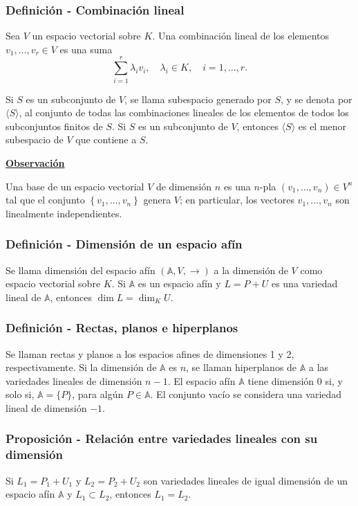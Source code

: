 \documentclass[12pt, a4paper, ones, notitlepage, openany,titlepage]{article}
\newcommand{\observacion}{\noindent\underline{\textbf{Observación}}}
\begin{document}
\subsubsection{Definición - Combinación lineal}
Sea $V$ un espacio vectorial sobre $K$. Una combinación lineal de los elementos $v_{1}, \ldots, v_{r} \in V$ es una suma
$$
\sum_{i=1}^{r} \lambda_{i} v_{i}, \quad \lambda_{i} \in K, \quad i=1, \ldots, r .
$$

Si $S$ es un subconjunto de $V$, se llama subespacio generado por $S$, y se denota por $\langle S\rangle$, al conjunto de todas las combinaciones lineales de los elementos de todos los subconjuntos finitos de $S$. Si $S$ es un subconjunto de $V$, entonces $\langle S\rangle$ es el menor subespacio de $V$ que contiene a $S$.

\observacion

Una base de un espacio vectorial $V$ de dimensión $n$ es una $n$-pla $\left(v_{1}, \ldots, v_{n}\right) \in V^{n}$ tal que el conjunto $\left\{v_{1}, \ldots, v_{n}\right\}$ genera $V$; en particular, los vectores $v_{1}, \ldots, v_{n}$ son linealmente independientes.

\subsubsection{Definición - Dimensión de un espacio afín}
Se llama dimensión del espacio afín $(\mathbb{A}, V, \rightarrow)$ a la dimensión de $V$ como espacio vectorial sobre $K$. Si $\mathbb{A}$ es un espacio afín y $L=P+U$ es una variedad lineal de $\mathbb{A}$, entonces $\dim  L=\dim _{K} U$.

\subsubsection{Definición - Rectas, planos e hiperplanos}
Se llaman rectas y planos a los espacios afines de dimensiones 1 y 2, respectivamente. Si la dimensión de $\mathbb{A}$ es $n$, se llaman hiperplanos de $\mathbb{A}$ a las variedades lineales de dimensión $n-1$. El espacio afín $\mathbb{A}$ tiene dimensión 0 si, y solo si, $\mathbb{A}=\{P\}$, para algún $P \in \mathbb{A}$. El conjunto vacío se considera una variedad lineal de dimensión $-1$.

\subsubsection{Proposición - Relación entre variedades lineales con su dimensión}
Si $L_{1}=P_{1}+U_{1}$ y $L_{2}=P_{2}+U_{2}$ son variedades lineales de igual dimensión de un espacio afín $\mathbb{A}$ y $L_{1} \subset L_{2}$, entonces $L_{1}=L_{2}$.
\end{document}
